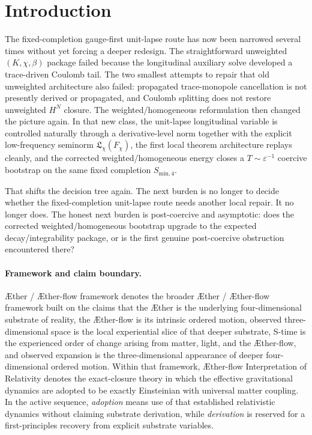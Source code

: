 \documentclass[11pt]{article}
\newcommand{\Aether}{\AE{}ther}
\newcommand{\Aflow}{\AE{}ther-flow}
\newcommand{\TheoryName}{\Aflow{} Interpretation of Relativity}
\newcommand{\TheoryProgram}{\Aether{} / \Aflow{} framework}
\begin{document}
\section{Introduction}

The fixed-completion gauge-first unit-lapse route has now been narrowed several times without yet forcing a deeper redesign. The straightforward unweighted \((K,\chi,\beta)\) package failed because the longitudinal auxiliary solve developed a trace-driven Coulomb tail. The two smallest attempts to repair that old unweighted architecture also failed: propagated trace-monopole cancellation is not presently derived or propagated, and Coulomb splitting does not restore unweighted \(H^N\) closure. The weighted/homogeneous reformulation then changed the picture again. In that new class, the unit-lapse longitudinal variable is controlled naturally through a derivative-level norm together with the explicit low-frequency seminorm \(\mathfrak L_\chi(F_\chi)\), the first local theorem architecture replays cleanly, and the corrected weighted/homogeneous energy closes a \(T\sim \varepsilon^{-1}\) coercive bootstrap on the same fixed completion \(S_{\mathrm{min},4}\).

That shifts the decision tree again. The next burden is no longer to decide whether the fixed-completion unit-lapse route needs another local repair. It no longer does. The honest next burden is post-coercive and asymptotic: does the corrected weighted/homogeneous bootstrap upgrade to the expected decay/integrability package, or is the first genuine post-coercive obstruction encountered there?

\paragraph{Framework and claim boundary.}
\TheoryProgram{} denotes the broader \Aether{} / \Aflow{} framework built on the claims that the \Aether{} is the underlying four-dimensional substrate of reality, the \Aflow{} is its intrinsic ordered motion, observed three-dimensional space is the local experiential slice of that deeper substrate, S-time is the experienced order of change arising from matter, light, and the \Aflow{}, and observed expansion is the three-dimensional appearance of deeper four-dimensional ordered motion. Within that framework, \TheoryName{} denotes the exact-closure theory in which the effective gravitational dynamics are adopted to be exactly Einsteinian with universal matter coupling. In the active sequence, \emph{adoption} means use of that established relativistic dynamics without claiming substrate derivation, while \emph{derivation} is reserved for a first-principles recovery from explicit substrate variables.
\end{document}

